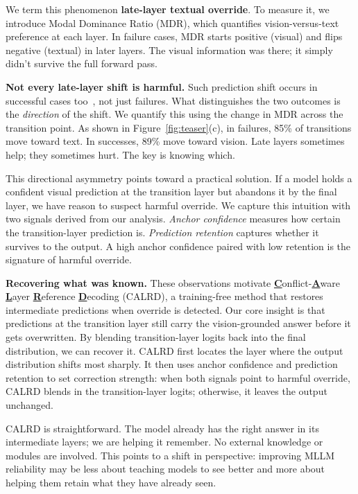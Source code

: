 We term this phenomenon \textbf{late-layer textual override}. To measure it, we introduce
Modal Dominance Ratio (MDR), which quantifies vision-versus-text
preference at each layer. In failure cases, MDR starts positive (visual)
and flips negative (textual) in later layers. The visual information was there; it simply didn't survive the full forward pass.

\textbf{Not every late-layer shift is harmful.}
Such prediction shift occurs in successful cases too~\cite{wang2025shift}, not just failures. What distinguishes the two outcomes is the \emph{direction} of the shift. We quantify this using the change in MDR across the transition point. As shown in Figure~\ref{fig:teaser}(c), in failures, 85\% of transitions move toward text. In successes, 89\% move toward vision. Late layers sometimes help; they sometimes hurt. The key
is knowing which.

This directional asymmetry points toward a practical solution. If a model holds a confident visual prediction at the transition layer but abandons it by the final layer, we have reason to suspect harmful override. We capture this intuition with two signals derived from our analysis. \textit{Anchor confidence} measures how certain the transition-layer prediction is. \textit{Prediction retention} captures whether it survives to the output. A high anchor confidence paired with low retention is the signature of harmful override.

\textbf{Recovering what was known.} These observations motivate \textbf{\underline{C}}onflict-\textbf{\underline{A}}ware \textbf{\underline{L}}ayer \textbf{\underline{R}}eference \textbf{\underline{D}}ecoding (CALRD), a training-free method that restores intermediate predictions when override is detected. Our core insight is that predictions at the transition layer still carry the vision-grounded answer before it gets overwritten. By blending transition-layer logits back into the final distribution, we can recover it. CALRD first locates the layer where the output distribution shifts most sharply. It then uses anchor confidence and prediction retention to set correction strength: when both signals point to harmful override, CALRD blends in the transition-layer logits; otherwise, it leaves the output unchanged.


CALRD is straightforward. The model already has the right answer in its intermediate layers; we are helping it remember. No external knowledge or modules are involved. This points to a shift in perspective: improving MLLM reliability may be less about teaching models to see better and more about helping them retain what they have already seen.


